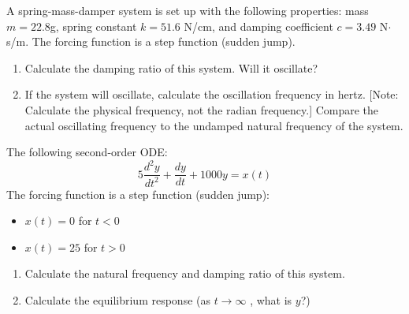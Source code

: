 \documentclass[a4paper,11pt]{book}
\begin{document}
\begin{question}

A spring-mass-damper system is set up with the following
properties: mass $m = 22.8$g, spring constant $k = 51.6$ N/cm, and damping coefficient $c = 3.49 $ N$\cdot$s/m. The forcing function is a step function (sudden jump).
\begin{enumerate}
\item Calculate the damping ratio of this system. Will it oscillate?
\item If the system will oscillate, calculate the oscillation frequency in hertz. [Note: Calculate the physical frequency, not the radian frequency.] Compare the actual oscillating frequency to the undamped natural frequency of the system.
\end{enumerate}
\examspace*{10em}

\end{question}
\begin{solution}


\end{solution}

\begin{question}

The following second-order ODE:
\begin{equation*}
5\frac{d^2y}{dt^2} + \frac{dy}{dt} + 1000y= x(t)
\end{equation*}
The forcing function is a step function (sudden jump):
\begin{itemize}
\item $x(t) = 0$ for $t<0$
\item $x(t) = 25$ for $t>0$
\end{itemize}


\begin{enumerate}
\item Calculate the natural frequency and damping ratio of this system.
\item Calculate the equilibrium response (as $t \to \infty$ , what is $y$?)
\end{enumerate}

\examspace*{10em}

\end{question}
\begin{solution}


\end{solution}
\end{document}
